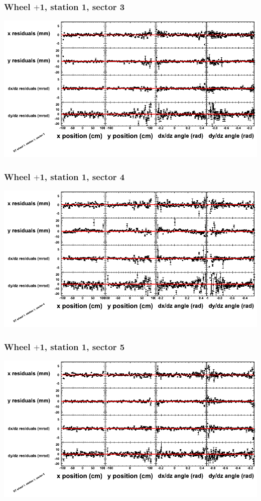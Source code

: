 \documentclass[compress]{beamer}
\begin{document}
\begin{frame}
\frametitle{Wheel $+$1, station 1, sector 3}
\includegraphics[width=\linewidth]{tmppoly_MBwhDst1sec03.png}
\end{frame}

\begin{frame}
\frametitle{Wheel $+$1, station 1, sector 4}
\includegraphics[width=\linewidth]{tmppoly_MBwhDst1sec04.png}
\end{frame}

\begin{frame}
\frametitle{Wheel $+$1, station 1, sector 5}
\includegraphics[width=\linewidth]{tmppoly_MBwhDst1sec05.png}
\end{frame}
\end{document}
